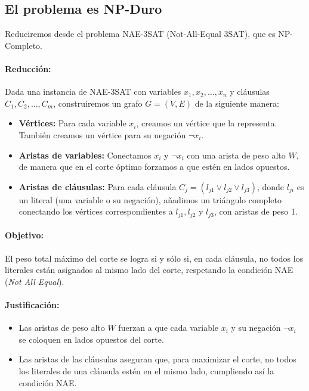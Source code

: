 \documentclass[12pt]{article}
\begin{document}
\subsection*{El problema es NP-Duro}

Reduciremos desde el problema NAE-3SAT (Not-All-Equal 3SAT), que es NP-Completo.

\paragraph{Reducción:}
Dada una instancia de NAE-3SAT con variables $x_1, x_2, \ldots, x_n$ y cláusulas $C_1, C_2, \ldots, C_m$, construiremos un grafo $G = (V, E)$ de la siguiente manera:

\begin{itemize}
  \item \textbf{Vértices:} Para cada variable $x_i$, creamos un vértice que la representa. 
  También creamos un vértice para su negación $\neg x_i$.
  
  \item \textbf{Aristas de variables:} Conectamos $x_i$ y $\neg x_i$ con una arista de peso alto $W$, 
  de manera que en el corte óptimo forzamos a que estén en lados opuestos.
  
  \item \textbf{Aristas de cláusulas:} Para cada cláusula 
  $C_j = (l_{j1} \lor l_{j2} \lor l_{j3})$, donde $l_{ji}$ es un literal (una variable o su negación), 
  añadimos un triángulo completo conectando los vértices correspondientes a 
  $l_{j1}, l_{j2}$ y $l_{j3}$, con aristas de peso 1. 
\end{itemize}

\paragraph{Objetivo:} 
El peso total máximo del corte se logra si y sólo si, en cada cláusula, no todos los literales están asignados al mismo lado del corte, respetando la condición NAE (\textit{Not All Equal}).

\paragraph{Justificación:}
\begin{itemize}
  \item Las aristas de peso alto $W$ fuerzan a que cada variable $x_i$ y su negación $\neg x_i$ 
  se coloquen en lados opuestos del corte.
  \item Las aristas de las cláusulas aseguran que, para maximizar el corte, 
  no todos los literales de una cláusula estén en el mismo lado, 
  cumpliendo así la condición NAE.
\end{itemize}
\end{document}
